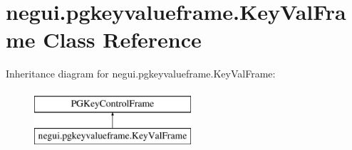 \hypertarget{classnegui_1_1pgkeyvalueframe_1_1KeyValFrame}{}\section{negui.\+pgkeyvalueframe.\+Key\+Val\+Frame Class Reference}
\label{classnegui_1_1pgkeyvalueframe_1_1KeyValFrame}
Inheritance diagram for negui.\+pgkeyvalueframe.\+Key\+Val\+Frame\+:\begin{figure}[H]
\begin{center}
\leavevmode
\includegraphics[height=2.000000cm]{classnegui_1_1pgkeyvalueframe_1_1KeyValFrame}
\end{center}
\end{figure}
